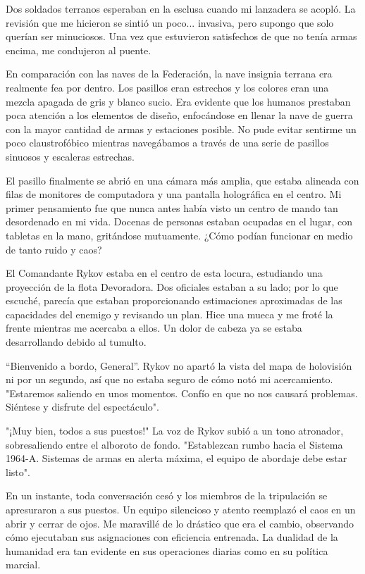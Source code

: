 \documentclass[spanish,12pt,a4paper,oneside,titlepage]{book}
\begin{document}
    Dos soldados terranos esperaban en la esclusa cuando mi lanzadera se acopló. La revisión que me hicieron se sintió un poco... invasiva, pero supongo que solo querían ser minuciosos. Una vez que estuvieron satisfechos de que no tenía armas encima, me condujeron al puente.

    En comparación con las naves de la Federación, la nave insignia terrana era realmente fea por dentro. Los pasillos eran estrechos y los colores eran una mezcla apagada de gris y blanco sucio. Era evidente que los humanos prestaban poca atención a los elementos de diseño, enfocándose en llenar la nave de guerra con la mayor cantidad de armas y estaciones posible. No pude evitar sentirme un poco claustrofóbico mientras navegábamos a través de una serie de pasillos sinuosos y escaleras estrechas.

    El pasillo finalmente se abrió en una cámara más amplia, que estaba alineada con filas de monitores de computadora y una pantalla holográfica en el centro. Mi primer pensamiento fue que nunca antes había visto un centro de mando tan desordenado en mi vida. Docenas de personas estaban ocupadas en el lugar, con tabletas en la mano, gritándose mutuamente. ¿Cómo podían funcionar en medio de tanto ruido y caos?

    El Comandante Rykov estaba en el centro de esta locura, estudiando una proyección de la flota Devoradora. Dos oficiales estaban a su lado; por lo que escuché, parecía que estaban proporcionando estimaciones aproximadas de las capacidades del enemigo y revisando un plan. Hice una mueca y me froté la frente mientras me acercaba a ellos. Un dolor de cabeza ya se estaba desarrollando debido al tumulto.

    “Bienvenido a bordo, General”. Rykov no apartó la vista del mapa de holovisión ni por un segundo, así que no estaba seguro de cómo notó mi acercamiento. "Estaremos saliendo en unos momentos. Confío en que no nos causará problemas. Siéntese y disfrute del espectáculo".

    "¡Muy bien, todos a sus puestos!" La voz de Rykov subió a un tono atronador, sobresaliendo entre el alboroto de fondo. "Establezcan rumbo hacia el Sistema 1964-A. Sistemas de armas en alerta máxima, el equipo de abordaje debe estar listo".

    En un instante, toda conversación cesó y los miembros de la tripulación se apresuraron a sus puestos. Un equipo silencioso y atento reemplazó el caos en un abrir y cerrar de ojos. Me maravillé de lo drástico que era el cambio, observando cómo ejecutaban sus asignaciones con eficiencia entrenada. La dualidad de la humanidad era tan evidente en sus operaciones diarias como en su política marcial.
\end{document}
